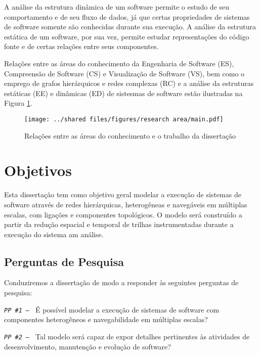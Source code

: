 A análise da estrutura dinâmica de um software permite o estudo de seu
comportamento e de seu fluxo de dados, já que certas propriedades de sistemas de
software somente são conhecidas durante sua execução. A análise da estrutura
estática de um software, por sua vez, permite estudar representações do código
fonte e de certas relações entre seus componentes.

Relações entre as áreas do conhecimento da Engenharia de Software (ES),
Compreensão de Software (CS) e Visualização de Software (VS), bem como o emprego
de grafos hierárquicos e redes complexas (RC) e a análise da estruturas
estáticas (EE) e dinâmicas (ED) de sistesmas de software estão ilustradas na
Figura \ref{fig:RelaçãoConhecimentoTrabalho}.

\begin{figure}[!htb]
    \centering
    \caption{Relações entre as áreas do conhecimento e o trabalho da dissertação}
    \texttt{[image: ../shared files/figures/research area/main.pdf]}
    \label{fig:RelaçãoConhecimentoTrabalho}
\end{figure}

\section{Objetivos}
\label{sec:Objetivos}

Esta dissertação tem como objetivo geral modelar a execução de sistemas de
software através de redes hierárquicas, heterogêneas e navegáveis em múltiplas
escalas, com ligações e componentes topológicos. O modelo será construído a
partir da redução espacial e temporal de trilhas instrumentadas durante a
execução do sistema am análise.

\subsection{Perguntas de Pesquisa}
\label{subsec:PerguntasPesquisa}

Conduziremos a dissertação de modo a responder às seguintes perguntas de
pesquisa:

\noindent
\texttt{\textit{PP \#1 -- }}
É possível modelar a execução de sistemas de software com componentes
heterogêneos e navegabilidade em múltiplas escalas?

\noindent
\texttt{\textit{PP \#2 -- }}
Tal modelo será capaz de expor detalhes pertinentes às atividades de
desenvolvimento, manutenção e evolução de software?

